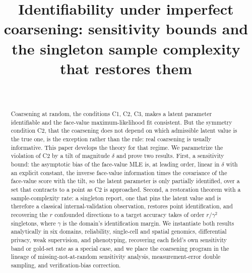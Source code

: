 \documentclass[ejsv2,noshowframe]{imsart}
\theoremstyle{plain}
\theoremstyle{definition}
\newcommand{\1}{\mathbf{1}}
\begin{document}
\begin{frontmatter}

\title{Identifiability under imperfect coarsening: sensitivity bounds
       and the singleton sample complexity that restores them}

\begin{aug}
\author[A]{~}

\address[A]{Department of Computer Science,
Southern Illinois University Edwardsville,
Edwardsville, Illinois, USA.}
\end{aug}

\begin{abstract}
Coarsening at random, the conditions C1, C2, C3, makes a latent parameter
identifiable and the face-value maximum-likelihood fit consistent. But the symmetry
condition C2, that the coarsening does not depend on which admissible latent value is
the true one, is the exception rather than the rule: real coarsening is usually
informative. This paper develops the theory for that regime. We parametrize the
violation of C2 by a tilt of magnitude $\delta$ and prove two results. First, a
sensitivity bound: the asymptotic bias of the face-value MLE is, at leading order,
linear in $\delta$ with an explicit constant, the inverse face-value information
times the covariance of the face-value score with the tilt, so the latent parameter
is only partially identified, over a set that contracts to a point as C2 is
approached. Second, a restoration theorem with a sample-complexity rate: a singleton
report, one that pins the latent value and is therefore a classical
internal-validation observation, restores point identification, and recovering the
$r$ confounded directions to a target accuracy takes of order $r / \gamma^2$
singletons, where $\gamma$ is the domain's identification margin. We instantiate both
results analytically in six domains, reliability, single-cell and spatial genomics,
differential privacy, weak supervision, and phenotyping, recovering each field's own
sensitivity band or gold-set rate as a special case, and we place the coarsening
program in the lineage of missing-not-at-random sensitivity analysis,
measurement-error double sampling, and verification-bias correction.
\end{abstract}

\begin{keyword}[class=MSC2020]
\end{keyword}

\begin{keyword}
\end{keyword}

\end{frontmatter}
\end{document}

